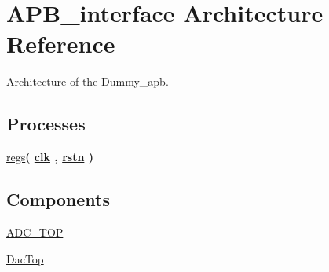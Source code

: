 \hypertarget{classdummyapb_1_1APB__interface}{\section{A\-P\-B\-\_\-interface Architecture Reference}
\label{classdummyapb_1_1APB__interface}
}


Architecture of the Dummy\-\_\-apb.  


\subsection*{Processes}
 \begin{DoxyCompactItemize}
\item 
\hypertarget{classdummyapb_1_1APB__interface_a7b544993da64c8f112760250ae38b7cd}{\hyperlink{classdummyapb_1_1APB__interface_a7b544993da64c8f112760250ae38b7cd}{regs}{\bfseries  ( {\bfseries {\bfseries \hyperlink{classdummyapb_af1c59ef8e5ba3edeeb313b4be18d7d8a}{clk}} \textcolor{vhdlchar}{ }\textcolor{vhdlchar}{ }\textcolor{vhdlchar}{ }} , {\bfseries {\bfseries \hyperlink{classdummyapb_a8fb8388e1e2f3ac69332573f5909b4e8}{rstn}} \textcolor{vhdlchar}{ }} )}}\label{classdummyapb_1_1APB__interface_a7b544993da64c8f112760250ae38b7cd}

\end{DoxyCompactItemize}
\subsection*{Components}
 \begin{DoxyCompactItemize}
\item 
\hypertarget{classdummyapb_1_1APB__interface_a7a18f50a54f16177c6eca989b84ebc7b}{\hyperlink{classdummyapb_1_1APB__interface_a7a18f50a54f16177c6eca989b84ebc7b}{A\-D\-C\-\_\-\-T\-O\-P}  {\bfseries }  }\label{classdummyapb_1_1APB__interface_a7a18f50a54f16177c6eca989b84ebc7b}

\item 
\hypertarget{classdummyapb_1_1APB__interface_a68dc652e5df1fbc5e0657ac2658c7be2}{\hyperlink{classdummyapb_1_1APB__interface_a68dc652e5df1fbc5e0657ac2658c7be2}{Dac\-Top}  {\bfseries }  }\label{classdummyapb_1_1APB__interface_a68dc652e5df1fbc5e0657ac2658c7be2}

\end{DoxyCompactItemize}
